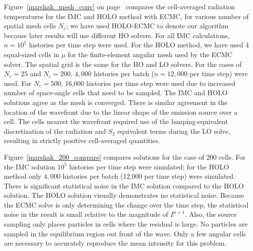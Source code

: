 Figure~\ref{marshak_mesh_conv} on page~\pageref{marshak_mesh_conv} compares the cell-averaged radiation temperatures  for the
IMC and HOLO method with ECMC, for various number of spatial mesh cells $N_c$; we
have used HOLO-ECMC to denote our algorithm because later results will use different HO solvers.   For
all IMC calculations, $n=10^5$ histories per time step were used.  For the HOLO method, we have used
4 equal-sized cells in $\mu$ for the finite-element angular mesh used by the ECMC
solver.  The spatial grid is the same for the HO and LO solvers. For the cases
of $N_c=25$ and $N_c=200$, $4,000$ histories per batch ($n=12,000$ per time step)
were used.  For $N_c=500$, 16,000 histories per time step were used due to increased
number of space-angle cells that
need to be sampled. The IMC and HOLO solutions agree as the mesh is converged.  There is
similar agreement in the location of the wavefront due to the linear shape of the emission source over a cell.  The cells
nearest the wavefront required use of the lumping-equivalent discretization of the
radiation and
$S_2$ equivalent terms during the LO
solve, resulting in strictly positive cell-averaged quantities.  

Figure~\ref{marshak_200_compare} compares solutions
for the case of 200 cells.  For the IMC solution $10^5$ histories per time step were
simulated; for the HOLO method only $4,000$ histories per batch
(12,000 per time step) were simulated. There is significant statistical noise in the IMC solution
compared to the HOLO solution.  The HOLO solution visually demonstrates no
statistical noise.  Because the ECMC solve is only determining the change over the
time step, the statistical noise in the result is small relative to the magnitude of
$I^{n+1}$.  Also, the source sampling only places particles in cells where the residual is
large.  No particles are sampled in the equilibrium region out front of the wave.  Only a
few angular cells are necessary to accurately reproduce the mean intensity for this problem.

